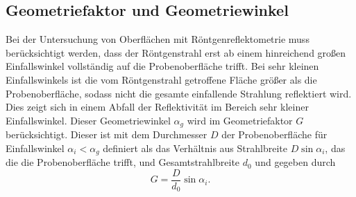 \subsection*{Geometriefaktor und Geometriewinkel}
Bei der Untersuchung von Oberflächen mit Röntgenreflektometrie muss berücksichtigt werden, dass der 
Röntgenstrahl erst ab einem hinreichend großen Einfallswinkel vollständig auf die Probenoberfläche trifft.
Bei sehr kleinen Einfallswinkels ist die vom Röntgenstrahl getroffene Fläche größer als die Probenoberfläche,
sodass nicht die gesamte einfallende Strahlung reflektiert wird. Dies zeigt sich in einem Abfall der 
Reflektivität im Bereich sehr kleiner Einfallswinkel.
Dieser Geometriewinkel $\alpha_g$ wird im Geometriefaktor $G$ berücksichtigt. Dieser ist mit dem Durchmesser 
$D$ der Probenoberfläche für Einfallswinkel $\alpha_i < \alpha_g$ definiert als 
das Verhältnis aus Strahlbreite $D \sin \alpha_i$, das die die Probenoberfläche trifft, und 
Gesamtstrahlbreite $d_0$ und gegeben durch
\begin{equation}
    G = \frac{D}{d_0} \sin \alpha_i  .
    \label{eq:geometrie}
\end{equation}
